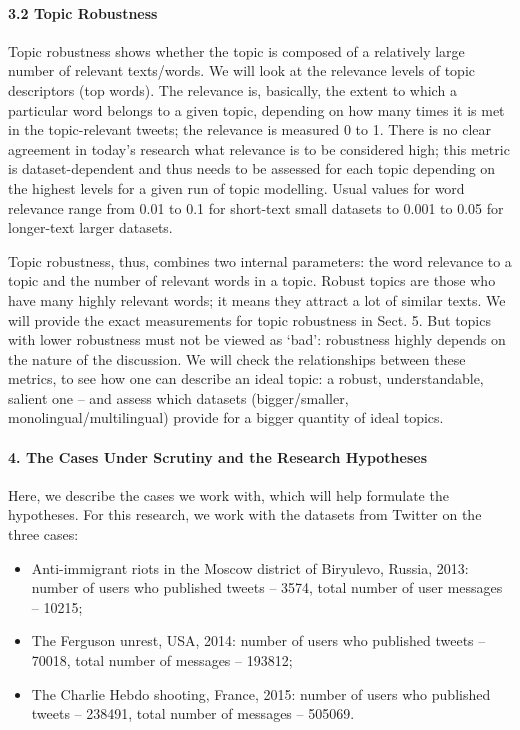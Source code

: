 \paragraph{3.2 Topic Robustness}

Topic robustness shows whether the topic is composed of a relatively large number of relevant texts/words. We will look at the relevance levels of topic descriptors (top words). The relevance is, basically, the extent to which a particular word belongs to a given topic, depending on how many times it is met in the topic-relevant tweets; the relevance is measured 0 to 1. There is no clear agreement in today’s research what relevance is to be considered high; this metric is dataset-dependent and thus needs to be assessed for each topic depending on the highest levels for a given run of topic modelling. Usual values for word relevance range from 0.01 to 0.1 for short-text small datasets to 0.001 to 0.05 for longer-text larger datasets.

Topic robustness, thus, combines two internal parameters: the word relevance to a topic and the number of relevant words in a topic. Robust topics are those who have many highly relevant words; it means they attract a lot of similar texts. We will provide the exact measurements for topic robustness in Sect. 5. But topics with lower robustness must not be viewed as ‘bad’: robustness highly depends on the nature of the discussion.
We will check the relationships between these metrics, to see how one can describe an ideal topic: a robust, understandable, salient one -- and assess which datasets (bigger/smaller, monolingual/multilingual) provide for a bigger quantity of ideal topics.

\paragraph{4. The Cases Under Scrutiny and the Research Hypotheses}

Here, we describe the cases we work with, which will help formulate the hypotheses. For this research, we work with the datasets from Twitter on the three cases:

\begin{itemize}
	\item Anti-immigrant riots in the Moscow district of Biryulevo, Russia, 2013: number of users who published tweets -- 3574, total number of user messages -- 10215;
	\item The Ferguson unrest, USA, 2014: number of users who published tweets -- 70018, total number of messages -- 193812;
	\item The Charlie Hebdo shooting, France, 2015: number of users who published tweets -- 238491, total number of messages -- 505069.
\end{itemize}

